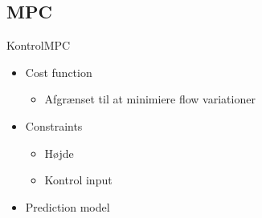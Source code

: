 \subsection{MPC}

\begin{frame}{Kontrol}{MPC}
    \vfill\vfill\centering
\begin{itemize}
	\item Cost function
	\begin{itemize}
		\item Afgrænset til at minimiere flow variationer
	\end{itemize}
	\item Constraints
	\begin{itemize}
		\item Højde
		\item Kontrol input
	\end{itemize}
	\item Prediction model
\end{itemize}
\vfill\vfill
\end{frame}





